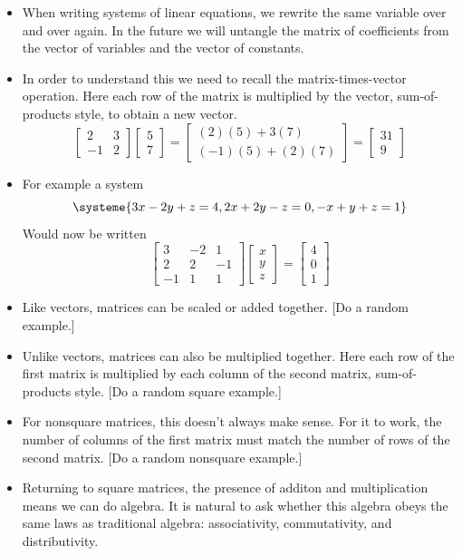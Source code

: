 \documentclass[11pt,oneside]{amsbook}
\theoremstyle{definition}
\theoremstyle{plain}
\theoremstyle{definition}
\theoremstyle{remark}
\numberwithin{equation}{section}
\numberwithin{figure}{section}
\begin{document}
\begin{itemize}
\item When writing systems of linear equations, we rewrite the same variable over and over again. In the future we will untangle the matrix of coefficients from the vector of variables and the vector of constants.
\item In order to understand this we need to recall the matrix-times-vector operation. Here each row of the matrix is multiplied by the vector, sum-of-products style, to obtain a new vector.
  \[\begin{bmatrix}2&3\\-1&2\end{bmatrix}
    \begin{bmatrix}5\\7\end{bmatrix}
    =\begin{bmatrix}(2)(5)+3(7)\\(-1)(5)+(2)(7)\end{bmatrix}
    =\begin{bmatrix}31\\9\end{bmatrix}
  \]
\item For example a system
  \[\systeme{3x-2y+z=4,2x+2y-z=0,-x+y+z=1}
  \]
  Would now be written
  \[\begin{bmatrix}3&-2&1\\2&2&-1\\-1&1&1\end{bmatrix}
    \begin{bmatrix}x\\y\\z\end{bmatrix}
    =\begin{bmatrix}4\\0\\1\end{bmatrix}
  \]
\item Like vectors, matrices can be scaled or added together. [Do a random example.]
\item Unlike vectors, matrices can also be multiplied together. Here each row of the first matrix is multiplied by each column of the second matrix, sum-of-products style. [Do a random square example.]
\item For nonsquare matrices, this doesn't always make sense. For it to work, the number of columns of the first matrix must match the number of rows of the second matrix. [Do a random nonsquare example.]
\item Returning to square matrices, the presence of additon and multiplication means we can do algebra. It is natural to ask whether this algebra obeys the same laws as traditional algebra: associativity, commutativity, and distributivity.
\end{itemize}
\end{document}
